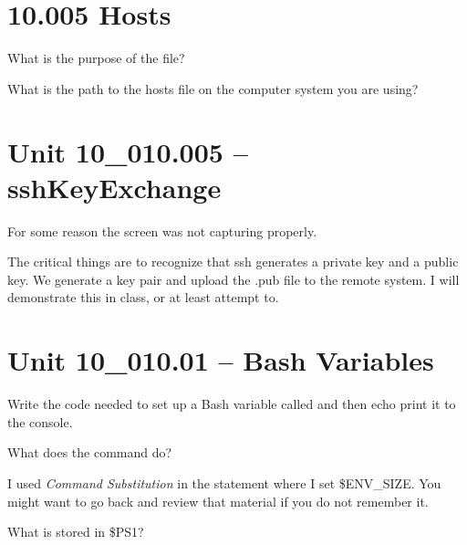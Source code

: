 \documentclass[letterpaper,12pt]{exam}
\newcommand{\unit}{Unit 10}
\begin{document}
\begin {questions}

\section*{10.005 Hosts} %

\begin{samepage}
\question What is the purpose of the  file?
\vspace{5mm}
\end{samepage}

\begin{samepage}
\question What is the path to the hosts file on the computer system you are using? 
\vspace{5mm}
\end{samepage}

\section*{\unit\_010.005 -- sshKeyExchange}
\noindent For some reason the screen was not capturing properly.  

\noindent The critical things are to recognize that ssh generates a private key and a public key.  We generate a key pair and upload the .pub file to the remote system.  I will demonstrate this in class, or at least attempt to.

\section*{\unit\_010.01 -- Bash Variables}

\begin{samepage}
\question Write the code needed to set up a Bash variable called  and then echo print it to the console.
\vspace{15mm}
\end{samepage}

\begin{samepage}
\question What does the  command do? 
\vspace{5mm}
\end{samepage}

\noindent I used \textit{Command Substitution} in the statement where I set \$ENV\_SIZE.   You might want to go back and review that material if you do not remember it.

\begin{samepage}
\question What is stored in \$PS1? 
\vspace{5mm}
\end{samepage}


\end{questions}
\end{document}
